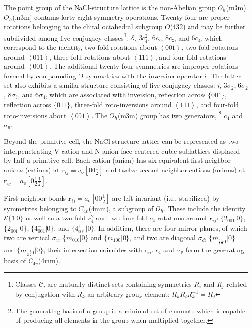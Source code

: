 \documentclass[twocolumn,showpacs,preprintnumbers,superscriptaddress,prb,floatfix,aps,10pt]{revtex4-1}
\renewcommand{\vec}[1]{\ensuremath{\mathbf{#1}}}
\newcommand*{\class}{\mathcal{C}}
\newcommand*{\id}{\mathcal{E}}
\newcommand*{\bondvec}{\vec{r}_{ij}}
\newcommand{\seitz}[2]{\{#1|#2\}}
\begin{document}
The point group of the NaCl-structure lattice is the non-Abelian group $O_h$(m$\bar{3}$m). $O_h$(m$\bar{3}$m) contains forty-eight symmetry operations. Twenty-four are proper rotations belonging to the chiral octahedral subgroup $O$(432) and may be further subdivided among five conjugacy classes\footnote{Classes $\class_i$ are mutually distinct sets containing symmetries $R_i$ and $R_j$ related by conjugation with $R_k$ an arbitrary group element: $R_kR_iR_k^{-1}=R_j$}: $\id$, $3c_4^2$, $6c_2$, $8c_3$, and $6c_4$, which correspond to the identity, two-fold rotations about $\left<001\right>$, two-fold rotations around $\left<011\right>$, three-fold rotations about $\left<111\right>$, and four-fold rotations around $\left<001\right>$. The additional twenty-four symmetries are improper rotations formed by compounding $O$ symmetries with the inversion operator $i$. The latter set also exhibits a similar structure consisting of five conjugacy classes: $i$, $3\sigma_2$, $6\sigma_2$, $8\sigma_6$, and $6\sigma_4$, which are associated with inversion, reflection across $\{001\}$, reflection across $\{011\}$, three-fold roto-inversions around $\left<111\right>$, and four-fold roto-inversions about $\left<001\right>$. The $O_h$(m$\bar{3}$m) group has two generators, \footnote{The generating basis of a group is a minimal set of elements which is capable of producing all elements in the group when multiplied together.} $c_4$ and $\sigma_6$.


Beyond the primitive cell, the NaCl-structure lattice can be represented as two interpenetrating V cation and N anion face-centered cubic sublattices displaced by half a primitive cell. Each cation (anion) has six equivalent first neighbor anions (cations) at $\bondvec = a_o [0 0 \frac{1}{2}]$ and twelve second neighbor cations (anions) at $\bondvec = a_o[0 \frac{1}{2} \frac{1}{2}]$. 

First-neighbor bonds $\bondvec = a_o[00\frac{1}{2}]$ are left invariant (i.e., stabilized) by symmetries belonging to $C_{4v}$(4mm), a subgroup of $O_h$. These include the identity $\id \seitz{1}{0}$ as well as a two-fold $c_{4}^2$ and two four-fold $c_{4}$ rotations around $\bondvec$: $\seitz{2_{001}}{0}$, $\seitz{2_{001}}{0}$, $\seitz{4^-_{001}}{0}$, and $\seitz{4^+_{001}}{0}$. In addition, there are four mirror planes, of which two are vertical $\sigma_v$, $\seitz{m_{010}}{0}$ and $\seitz{m_{100}}{0}$, and two are diagonal $\sigma_d$, $\seitz{m_{\frac{1}{2}\bar{\frac{1}{2}}0}}{0}$ and $\seitz{m_{\frac{1}{2}\frac{1}{2}0}}{0}$; their intersection coincides with $\bondvec$. $c_4$ and $\sigma_v$ form the generating basis of $C_{4v}$(4mm). 
\end{document}
